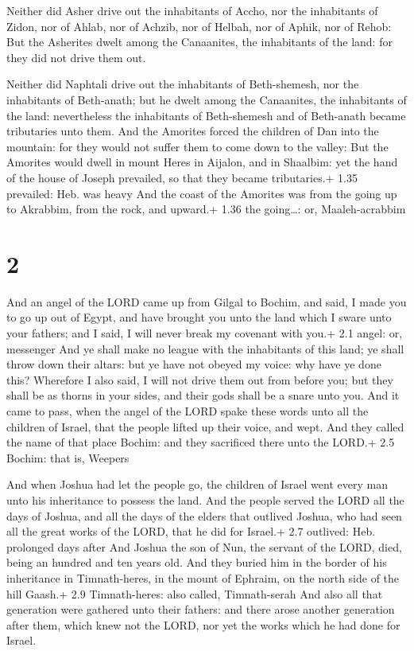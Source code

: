  Neither did Asher drive out the inhabitants of Accho,
nor the inhabitants of Zidon, nor of Ahlab, nor of Achzib, nor of
Helbah, nor of Aphik, nor of Rehob:  But the Asherites
dwelt among the Canaanites, the inhabitants of the land: for they did
not drive them out.

 Neither did Naphtali drive out the inhabitants of
Beth-shemesh, nor the inhabitants of Beth-anath; but he dwelt among the
Canaanites, the inhabitants of the land: nevertheless the inhabitants of
Beth-shemesh and of Beth-anath became tributaries unto them.
 And the Amorites forced the children of Dan into the
mountain: for they would not suffer them to come down to the valley:
 But the Amorites would dwell in mount Heres in Aijalon,
and in Shaalbim: yet the hand of the house of Joseph prevailed, so that
they became tributaries.+ 1.35 prevailed: Heb. was heavy 
And the coast of the Amorites was from the going up to Akrabbim, from
the rock, and upward.+ 1.36 the going\ldots: or, Maaleh-acrabbim

\hypertarget{section-1}{%
\section{2}\label{section-1}}

 And an angel of the LORD came up from Gilgal to Bochim, and
said, I made you to go up out of Egypt, and have brought you unto the
land which I sware unto your fathers; and I said, I will never break my
covenant with you.+ 2.1 angel: or, messenger  And ye shall
make no league with the inhabitants of this land; ye shall throw down
their altars: but ye have not obeyed my voice: why have ye done this?
 Wherefore I also said, I will not drive them out from
before you; but they shall be as thorns in your sides, and their gods
shall be a snare unto you.  And it came to pass, when the
angel of the LORD spake these words unto all the children of Israel,
that the people lifted up their voice, and wept.  And they
called the name of that place Bochim: and they sacrificed there unto the
LORD.+ 2.5 Bochim: that is, Weepers

 And when Joshua had let the people go, the children of
Israel went every man unto his inheritance to possess the land.
 And the people served the LORD all the days of Joshua, and
all the days of the elders that outlived Joshua, who had seen all the
great works of the LORD, that he did for Israel.+ 2.7 outlived: Heb.
prolonged days after  And Joshua the son of Nun, the servant
of the LORD, died, being an hundred and ten years old.  And
they buried him in the border of his inheritance in Timnath-heres, in
the mount of Ephraim, on the north side of the hill Gaash.+ 2.9
Timnath-heres: also called, Timnath-serah  And also all
that generation were gathered unto their fathers: and there arose
another generation after them, which knew not the LORD, nor yet the
works which he had done for Israel.

